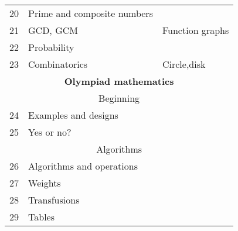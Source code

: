 \documentclass[a4paper]{article}
\begin{document}
\begin{center}
\begin{longtable}{|lll|}
    \multicolumn{1}{|l|}{20} & \multicolumn{1}{l|}{Prime and composite numbers}       & \multicolumn{1}{c|}{\multirow{3}{*}{Function graphs}} \\ \cline{1-2}
    \multicolumn{1}{|l|}{21} & \multicolumn{1}{l|}{GCD, GCM}                          & \multicolumn{1}{c|}{}                                 \\ \cline{1-2}
    \multicolumn{1}{|l|}{22} & \multicolumn{1}{l|}{Probability}                       & \multicolumn{1}{c|}{}                                 \\ \hline
    \multicolumn{1}{|l|}{23} & \multicolumn{1}{l|}{Combinatorics}                     & Circle,disk                                           \\ \hline
    \multicolumn{3}{|c|}{\textbf{Olympiad mathematics}}                                                                                       \\ \hline
    \multicolumn{3}{|c|}{Beginning}                                                                                                           \\ \hline
    \multicolumn{1}{|l|}{24} & \multicolumn{1}{l|}{Examples and designs}              &                                                       \\ \hline
    \multicolumn{1}{|l|}{25} & \multicolumn{1}{l|}{Yes or no?}                        &                                                       \\ \hline
    \multicolumn{3}{|c|}{Algorithms}                                                                                                          \\ \hline
    \multicolumn{1}{|l|}{26} & \multicolumn{1}{l|}{Algorithms and operations}         &                                                       \\ \hline
    \multicolumn{1}{|l|}{27} & \multicolumn{1}{l|}{Weights}                           &                                                       \\ \hline
    \multicolumn{1}{|l|}{28} & \multicolumn{1}{l|}{Transfusions}                      &                                                       \\ \hline
    \multicolumn{1}{|l|}{29} & \multicolumn{1}{l|}{Tables}                            &                                                       \\ \hline
    \end{longtable}

\end{center}
\end{document}
